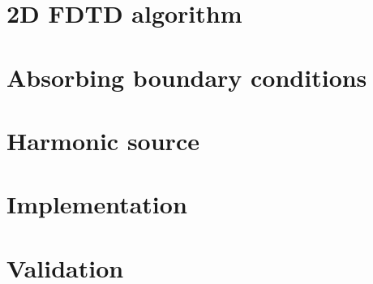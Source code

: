 \documentclass[12pt,english]{article}
\begin{document}

\section{2D FDTD algorithm}


\section{Absorbing boundary conditions}


\section{Harmonic source}


\section{Implementation}


\section{Validation}

\end{document}
